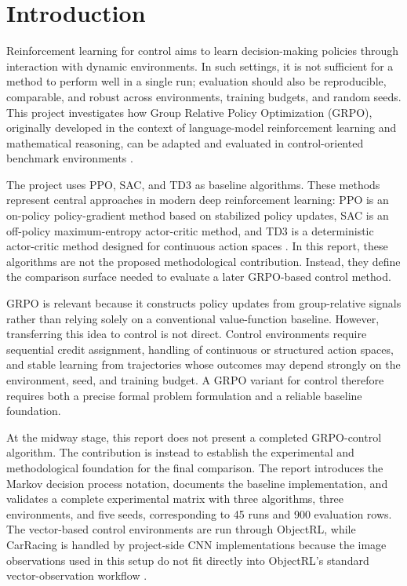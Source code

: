 \section{Introduction}
\label{sec:introduction}

Reinforcement learning for control aims to learn decision-making policies through interaction with dynamic environments. In such settings, it is not sufficient for a method to perform well in a single run; evaluation should also be reproducible, comparable, and robust across environments, training budgets, and random seeds. This project investigates how Group Relative Policy Optimization (GRPO), originally developed in the context of language-model reinforcement learning and mathematical reasoning, can be adapted and evaluated in control-oriented benchmark environments \citep{shao2024deepseekmath}.

The project uses PPO, SAC, and TD3 as baseline algorithms. These methods represent central approaches in modern deep reinforcement learning: PPO is an on-policy policy-gradient method based on stabilized policy updates, SAC is an off-policy maximum-entropy actor-critic method, and TD3 is a deterministic actor-critic method designed for continuous action spaces \citep{schulman2017proximal,haarnoja2018sacapps,fujimoto2018td3}. In this report, these algorithms are not the proposed methodological contribution. Instead, they define the comparison surface needed to evaluate a later GRPO-based control method.

GRPO is relevant because it constructs policy updates from group-relative signals rather than relying solely on a conventional value-function baseline. However, transferring this idea to control is not direct. Control environments require sequential credit assignment, handling of continuous or structured action spaces, and stable learning from trajectories whose outcomes may depend strongly on the environment, seed, and training budget. A GRPO variant for control therefore requires both a precise formal problem formulation and a reliable baseline foundation.

At the midway stage, this report does not present a completed GRPO-control algorithm. The contribution is instead to establish the experimental and methodological foundation for the final comparison. The report introduces the Markov decision process notation, documents the baseline implementation, and validates a complete experimental matrix with three algorithms, three environments, and five seeds, corresponding to 45 runs and 900 evaluation rows. The vector-based control environments are run through ObjectRL, while CarRacing is handled by project-side CNN implementations because the image observations used in this setup do not fit directly into ObjectRL's standard vector-observation workflow \citep{baykal2025objectrl,towers2024gymnasium}.

